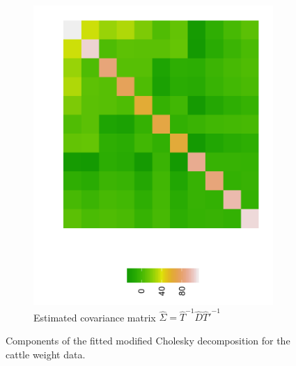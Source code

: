 \begin{figure}[H]
\begin{subfigure}{.33\textwidth}
  \includegraphics[width = \textwidth]{img/chapter-5/cattle-cov-estimate-ggplot}
 \caption{Estimated covariance matrix $\hat{\Sigma} = \hat{T}^{-1} \hat{D} {\hat{T}'}^{-1}$}
 \end{subfigure}
\caption{Components of the fitted modified Cholesky decomposition for the cattle weight data.} \label{fig:fitted-cholesky-decomposition-cattle-date}
\end{figure}


